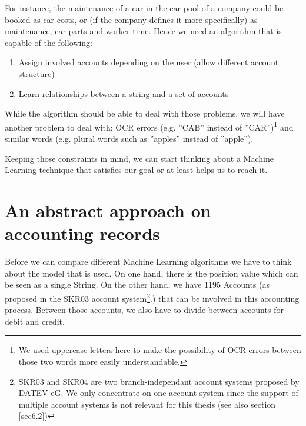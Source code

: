 For instance, the maintenance of a car in the car pool of a company could be booked as car costs, or (if the company defines it more specifically) as maintenance, car parts and worker time.
Hence we need an algorithm that is capable of the following:
\begin{enumerate}
		\item Assign involved accounts depending on the user (allow different account structure)
		\item Learn relationships between a string and a set of accounts
\end{enumerate}
While the algorithm should be able to deal with those problems, we will have another problem to deal with: OCR errors (e.g. ''CAB'' instead of ''CAR'')\footnote{We used uppercase letters here to make the possibility of OCR errors between those two words more easily understandable.}  and similar words (e.g. plural words such as ''apples'' instead of ''apple''). 

Keeping those constraints in mind, we can start thinking about a Machine Learning technique that satisfies our goal or at least helps us to reach it.


\section{An abstract approach on accounting records}
\label{sec4.1}

Before we can compare different Machine Learning algorithms we have to think about the model that is used. On one hand, there is the position value which can be seen as a single String. On the other hand, we have 1195 Accounts (as proposed in the SKR03 account system\cite{datev12}\footnote{SKR03 and SKR04 are two branch-independant account systems proposed by DATEV eG. We only concentrate on one account system since the support of multiple account systems is not relevant for this thesis (see also section \ref{sec6.2})}.) that can be involved in this accounting process. Between those accounts, we also have to divide between accounts for debit and credit.

